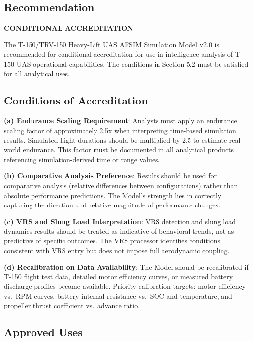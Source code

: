\documentclass[11pt, letterpaper]{article}
\begin{document}
\subsection{\unclass Recommendation}

\unclass \textbf{CONDITIONAL ACCREDITATION}

\unclass The T-150/TRV-150 Heavy-Lift UAS AFSIM Simulation Model v2.0 is recommended for conditional accreditation for use in intelligence analysis of T-150 UAS operational capabilities. The conditions in Section 5.2 must be satisfied for all analytical uses.

\subsection{\unclass Conditions of Accreditation}

\unclass \textbf{(a) Endurance Scaling Requirement}: Analysts must apply an endurance scaling factor of approximately 2.5x when interpreting time-based simulation results. Simulated flight durations should be multiplied by 2.5 to estimate real-world endurance. This factor must be documented in all analytical products referencing simulation-derived time or range values.

\unclass \textbf{(b) Comparative Analysis Preference}: Results should be used for comparative analysis (relative differences between configurations) rather than absolute performance predictions. The Model's strength lies in correctly capturing the direction and relative magnitude of performance changes.

\unclass \textbf{(c) VRS and Slung Load Interpretation}: VRS detection and slung load dynamics results should be treated as indicative of behavioral trends, not as predictive of specific outcomes. The VRS processor identifies conditions consistent with VRS entry but does not impose full aerodynamic coupling.

\unclass \textbf{(d) Recalibration on Data Availability}: The Model should be recalibrated if T-150 flight test data, detailed motor efficiency curves, or measured battery discharge profiles become available. Priority calibration targets: motor efficiency vs.\ RPM curves, battery internal resistance vs.\ SOC and temperature, and propeller thrust coefficient vs.\ advance ratio.

\subsection{\unclass Approved Uses}
\end{document}
